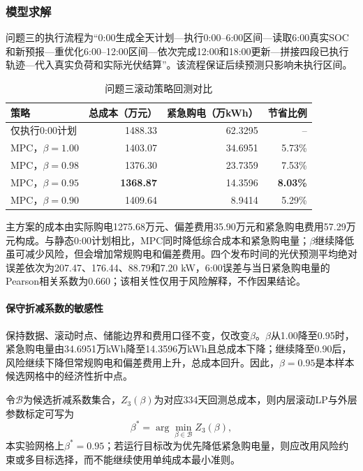 \documentclass{cumcmthesis}
\begin{document}
\subsubsection{模型求解}

问题三的执行流程为“0:00生成全天计划—执行0:00--6:00区间—读取6:00真实SOC和新预报—重优化6:00--12:00区间—依次完成12:00和18:00更新—拼接四段已执行轨迹—代入真实负荷和实际光伏结算”。该流程保证后续预测只影响未执行区间。

\begin{table}[H]
\centering
\renewcommand\arraystretch{1.2}
\caption{问题三滚动策略回测对比}
\label{tab:q3result}
\begin{tabular}{lrrr}
\toprule
\textbf{策略} & 总成本（万元） & 紧急购电（万kWh） & 节省比例\\
\midrule
仅执行0:00计划 & 1488.33 & 62.3295 & --\\
MPC，$\beta=1.00$ & 1403.07 & 34.6951 & 5.73\%\\
MPC，$\beta=0.98$ & 1376.30 & 23.7359 & 7.53\%\\
MPC，$\beta=0.95$ & \textbf{1368.87} & 14.3596 & \textbf{8.03\%}\\
MPC，$\beta=0.90$ & 1409.64 & 8.9414 & 5.29\%\\
\bottomrule
\end{tabular}
\end{table}

主方案的成本由实际购电1275.68万元、偏差费用35.90万元和紧急购电费用57.29万元构成。与静态0:00计划相比，MPC同时降低综合成本和紧急购电量；$\beta$继续降低虽可减少风险，但会增加常规购电和偏差费用。四个发布时间的光伏预测平均绝对误差依次为207.47、176.44、88.79和7.20 kW，6:00误差与当日紧急购电量的Pearson相关系数为0.660；该相关性仅用于风险解释，不作因果结论。

\paragraph{保守折减系数的敏感性}

保持数据、滚动时点、储能边界和费用口径不变，仅改变$\beta$。$\beta$从1.00降至0.95时，紧急购电量由34.6951万kWh降至14.3596万kWh且总成本下降；继续降至0.90后，风险继续下降但常规购电和偏差费用上升，总成本回升。因此，$\beta=0.95$是本样本候选网格中的经济性折中点。

令$\mathcal B$为候选折减系数集合，$Z_3(\beta)$为对应334天回测总成本，则内层滚动LP与外层参数标定可写为
\begin{equation}
\beta^*=\arg\min_{\beta\in\mathcal B} Z_3(\beta),
\tag{23a}
\end{equation}
本实验网格上$\beta^*=0.95$；若运行目标改为优先降低紧急购电量，则应改用风险约束或多目标选择，而不能继续使用单纯成本最小准则。
\end{document}
